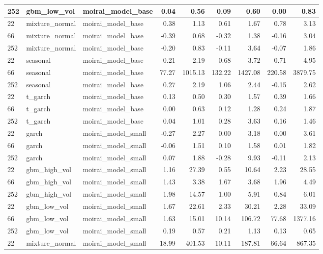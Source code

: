 {\begin{tabular}{lllrrrrrr}
252 & gbm\_low\_vol & moirai\_model\_base & 0.04 & 0.56 & 0.09 & 0.60 & 0.00 & 0.83 \\
\midrule
22 & mixture\_normal & moirai\_model\_base & 0.38 & 1.13 & 0.61 & 1.67 & 0.78 & 3.13 \\
66 & mixture\_normal & moirai\_model\_base & -0.39 & 0.68 & -0.32 & 1.38 & -0.16 & 3.04 \\
252 & mixture\_normal & moirai\_model\_base & -0.20 & 0.83 & -0.11 & 3.64 & -0.07 & 1.86 \\
\midrule
22 & seasonal & moirai\_model\_base & 0.21 & 2.19 & 0.68 & 3.72 & 0.71 & 4.95 \\
66 & seasonal & moirai\_model\_base & 77.27 & 1015.13 & 132.22 & 1427.08 & 220.58 & 3879.75 \\
252 & seasonal & moirai\_model\_base & 0.27 & 2.19 & 1.06 & 2.44 & -0.15 & 2.62 \\
\midrule
22 & t\_garch & moirai\_model\_base & 0.13 & 0.50 & 0.30 & 1.57 & 0.39 & 1.66 \\
66 & t\_garch & moirai\_model\_base & 0.00 & 0.63 & 0.12 & 1.28 & 0.24 & 1.87 \\
252 & t\_garch & moirai\_model\_base & 0.04 & 1.01 & 0.28 & 3.63 & 0.16 & 1.46 \\
\midrule
22 & garch & moirai\_model\_small & -0.27 & 2.27 & 0.00 & 3.18 & 0.00 & 3.61 \\
66 & garch & moirai\_model\_small & -0.06 & 1.51 & 0.10 & 1.58 & 0.01 & 1.82 \\
252 & garch & moirai\_model\_small & 0.07 & 1.88 & -0.28 & 9.93 & -0.11 & 2.13 \\
\midrule
22 & gbm\_high\_vol & moirai\_model\_small & 1.16 & 27.39 & 0.55 & 10.64 & 2.23 & 28.55 \\
66 & gbm\_high\_vol & moirai\_model\_small & 1.43 & 3.38 & 1.67 & 3.68 & 1.96 & 4.49 \\
252 & gbm\_high\_vol & moirai\_model\_small & 1.98 & 14.57 & 1.00 & 5.91 & 0.84 & 6.01 \\
\midrule
22 & gbm\_low\_vol & moirai\_model\_small & 1.67 & 22.61 & 2.33 & 30.21 & 2.28 & 33.09 \\
66 & gbm\_low\_vol & moirai\_model\_small & 1.63 & 15.01 & 10.14 & 106.72 & 77.68 & 1377.16 \\
252 & gbm\_low\_vol & moirai\_model\_small & 0.19 & 0.57 & 0.21 & 1.13 & 0.13 & 0.65 \\
\midrule
22 & mixture\_normal & moirai\_model\_small & 18.99 & 401.53 & 10.11 & 187.81 & 66.64 & 867.35 \\

\end{tabular}}
